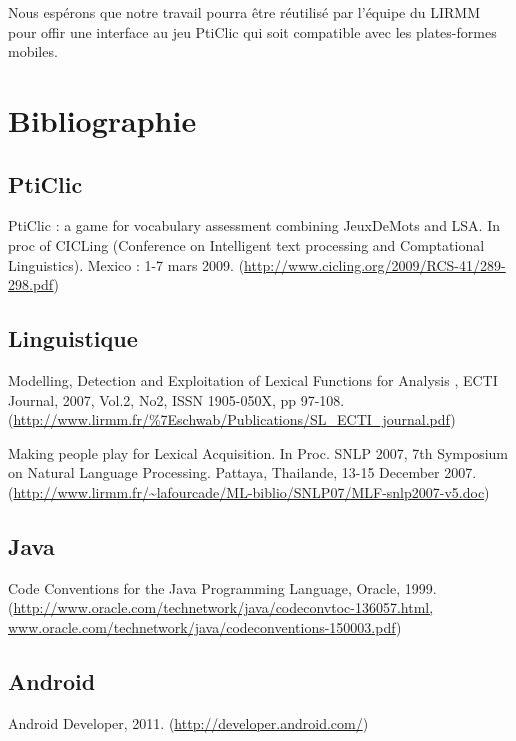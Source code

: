 \documentclass[a4paper,11pt,french]{article}
\def\android{Android\texttrademark{}}
\begin{document}
Nous espérons que notre travail pourra être réutilisé par l'équipe du LIRMM pour offir une interface au jeu PtiClic qui soit compatible avec
les plates-formes mobiles.

\newpage


\section{Bibliographie}
\subsection{PtiClic}

PtiClic : a game for vocabulary assessment combining JeuxDeMots and LSA. In proc of CICLing (Conference on Intelligent text processing and Comptational Linguistics). Mexico : 1-7 mars 2009. (\url{http://www.cicling.org/2009/RCS-41/289-298.pdf})


\subsection{Linguistique}

Modelling, Detection and Exploitation of Lexical Functions for Analysis , ECTI Journal, 2007, Vol.2, No2, ISSN 1905-050X, pp 97-108. (\url{http://www.lirmm.fr/\%7Eschwab/Publications/SL_ECTI_journal.pdf})

Making people play for Lexical Acquisition. In Proc. SNLP 2007, 7th Symposium on Natural Language Processing. Pattaya, Thailande, 13-15 December 2007. (\url{http://www.lirmm.fr/~lafourcade/ML-biblio/SNLP07/MLF-snlp2007-v5.doc})


\subsection{Java}

Code Conventions for the Java Programming Language, Oracle, 1999. (\url{http://www.oracle.com/technetwork/java/codeconvtoc-136057.html, www.oracle.com/technetwork/java/codeconventions-150003.pdf})

\subsection{\android{}}

Android Developer, 2011. (\url{http://developer.android.com/})




\end{document}
